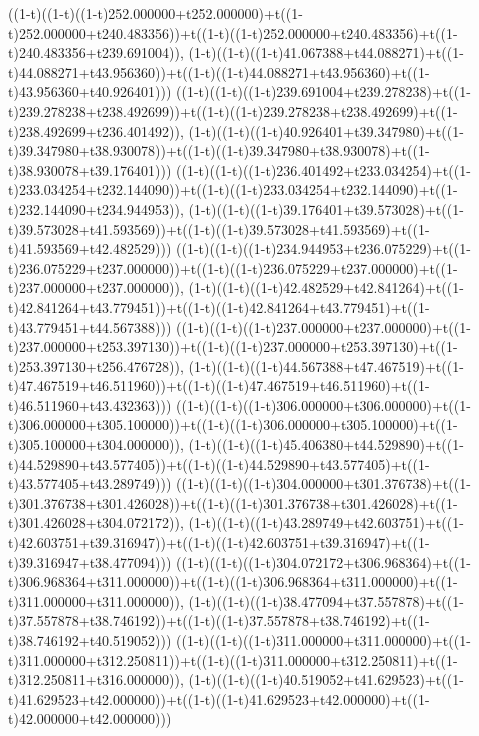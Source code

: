 ((1-t)((1-t)((1-t)252.000000+t252.000000)+t((1-t)252.000000+t240.483356))+t((1-t)((1-t)252.000000+t240.483356)+t((1-t)240.483356+t239.691004)),                                     (1-t)((1-t)((1-t)41.067388+t44.088271)+t((1-t)44.088271+t43.956360))+t((1-t)((1-t)44.088271+t43.956360)+t((1-t)43.956360+t40.926401)))
((1-t)((1-t)((1-t)239.691004+t239.278238)+t((1-t)239.278238+t238.492699))+t((1-t)((1-t)239.278238+t238.492699)+t((1-t)238.492699+t236.401492)),                                     (1-t)((1-t)((1-t)40.926401+t39.347980)+t((1-t)39.347980+t38.930078))+t((1-t)((1-t)39.347980+t38.930078)+t((1-t)38.930078+t39.176401)))
((1-t)((1-t)((1-t)236.401492+t233.034254)+t((1-t)233.034254+t232.144090))+t((1-t)((1-t)233.034254+t232.144090)+t((1-t)232.144090+t234.944953)),                                     (1-t)((1-t)((1-t)39.176401+t39.573028)+t((1-t)39.573028+t41.593569))+t((1-t)((1-t)39.573028+t41.593569)+t((1-t)41.593569+t42.482529)))
((1-t)((1-t)((1-t)234.944953+t236.075229)+t((1-t)236.075229+t237.000000))+t((1-t)((1-t)236.075229+t237.000000)+t((1-t)237.000000+t237.000000)),                                     (1-t)((1-t)((1-t)42.482529+t42.841264)+t((1-t)42.841264+t43.779451))+t((1-t)((1-t)42.841264+t43.779451)+t((1-t)43.779451+t44.567388)))
((1-t)((1-t)((1-t)237.000000+t237.000000)+t((1-t)237.000000+t253.397130))+t((1-t)((1-t)237.000000+t253.397130)+t((1-t)253.397130+t256.476728)),                                     (1-t)((1-t)((1-t)44.567388+t47.467519)+t((1-t)47.467519+t46.511960))+t((1-t)((1-t)47.467519+t46.511960)+t((1-t)46.511960+t43.432363)))
((1-t)((1-t)((1-t)306.000000+t306.000000)+t((1-t)306.000000+t305.100000))+t((1-t)((1-t)306.000000+t305.100000)+t((1-t)305.100000+t304.000000)),                                     (1-t)((1-t)((1-t)45.406380+t44.529890)+t((1-t)44.529890+t43.577405))+t((1-t)((1-t)44.529890+t43.577405)+t((1-t)43.577405+t43.289749)))
((1-t)((1-t)((1-t)304.000000+t301.376738)+t((1-t)301.376738+t301.426028))+t((1-t)((1-t)301.376738+t301.426028)+t((1-t)301.426028+t304.072172)),                                     (1-t)((1-t)((1-t)43.289749+t42.603751)+t((1-t)42.603751+t39.316947))+t((1-t)((1-t)42.603751+t39.316947)+t((1-t)39.316947+t38.477094)))
((1-t)((1-t)((1-t)304.072172+t306.968364)+t((1-t)306.968364+t311.000000))+t((1-t)((1-t)306.968364+t311.000000)+t((1-t)311.000000+t311.000000)),                                     (1-t)((1-t)((1-t)38.477094+t37.557878)+t((1-t)37.557878+t38.746192))+t((1-t)((1-t)37.557878+t38.746192)+t((1-t)38.746192+t40.519052)))
((1-t)((1-t)((1-t)311.000000+t311.000000)+t((1-t)311.000000+t312.250811))+t((1-t)((1-t)311.000000+t312.250811)+t((1-t)312.250811+t316.000000)),                                     (1-t)((1-t)((1-t)40.519052+t41.629523)+t((1-t)41.629523+t42.000000))+t((1-t)((1-t)41.629523+t42.000000)+t((1-t)42.000000+t42.000000)))
